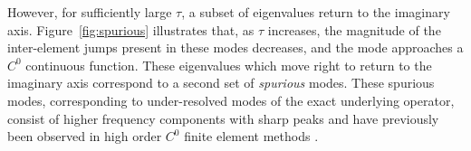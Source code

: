 \documentclass[10pt]{article}
\begin{document}
However, for sufficiently large $\tau$, a subset of eigenvalues return to the imaginary axis.  Figure~\ref{fig:spurious} illustrates that, as $\tau$ increases, the magnitude of the inter-element jumps present in these modes decreases, and the mode approaches a $C^0$ continuous function.  These eigenvalues which move right to return to the imaginary axis correspond to a second set of \emph{spurious} modes.  These spurious modes, corresponding to under-resolved modes of the exact underlying operator, consist of higher frequency components with sharp peaks and have previously been observed in high order $C^0$ finite element methods \cite{ainsworth2014dispersive,hughes2014finite}.  

\begin{figure}
\centering
{}
\hspace{.5em}
\hspace{.5em}
\\

\end{figure}
\end{document}
